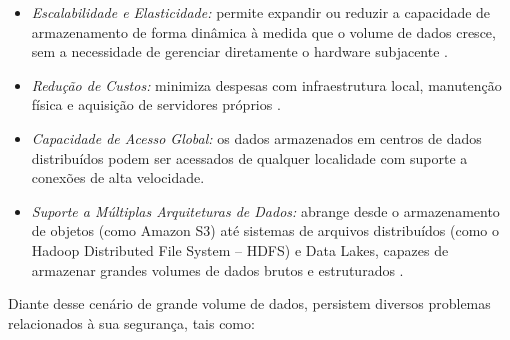 \begin{itemize}
    \item \textit{Escalabilidade e Elasticidade:} permite expandir ou reduzir a capacidade de armazenamento de forma dinâmica à medida que o volume de dados cresce, sem a necessidade de gerenciar diretamente o hardware subjacente \cite{energyandai}.
    \item \textit{Redução de Custos:} minimiza despesas com infraestrutura local, manutenção física e aquisição de servidores próprios \cite{amaral2013hysail}.
    \item \textit{Capacidade de Acesso Global:} os dados armazenados em centros de dados distribuídos podem ser acessados de qualquer localidade com suporte a conexões de alta velocidade\cite{amaral2013hysail}.
    \item \textit{Suporte a Múltiplas Arquiteturas de Dados:} abrange desde o armazenamento de objetos (como Amazon S3) até sistemas de arquivos distribuídos (como o Hadoop Distributed File System -- HDFS) e Data Lakes, capazes de armazenar grandes volumes de dados brutos e estruturados \cite{energyandai}.
\end{itemize}

Diante desse cenário de grande volume de dados, persistem diversos problemas relacionados à sua segurança, tais como:

